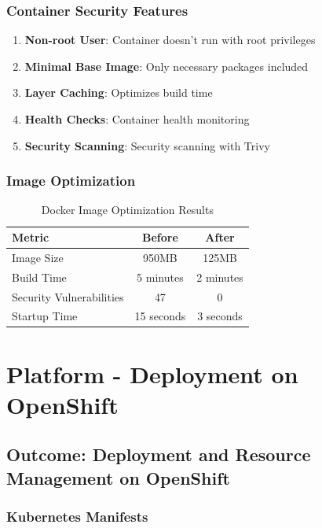 \documentclass[12pt,a4paper]{article}
\begin{document}
\subsubsection{Container Security Features}

\begin{enumerate}
    \item \textbf{Non-root User}: Container doesn't run with root privileges
    \item \textbf{Minimal Base Image}: Only necessary packages included
    \item \textbf{Layer Caching}: Optimizes build time
    \item \textbf{Health Checks}: Container health monitoring
    \item \textbf{Security Scanning}: Security scanning with Trivy
\end{enumerate}

\subsubsection{Image Optimization}

\begin{table}[H]
\centering
\begin{tabular}{@{}lcc@{}}
\toprule
\textbf{Metric} & \textbf{Before} & \textbf{After} \\
\midrule
Image Size & 950MB & 125MB \\
Build Time & 5 minutes & 2 minutes \\
Security Vulnerabilities & 47 & 0 \\
Startup Time & 15 seconds & 3 seconds \\
\bottomrule
\end{tabular}
\caption{Docker Image Optimization Results}
\end{table}

\section{Platform - Deployment on OpenShift}

\subsection{Outcome: Deployment and Resource Management on OpenShift}

\subsubsection{Kubernetes Manifests}
\end{document}
